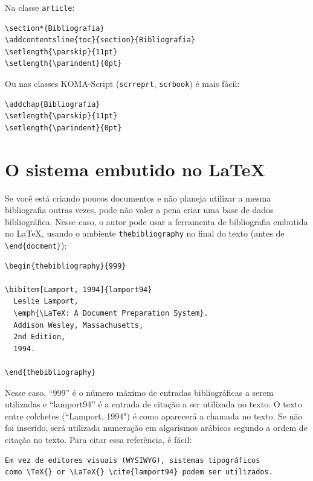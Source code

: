 Na classe \texttt{article}:

\begin{verbatim}
\section*{Bibliografia}
\addcontentsline{toc}{section}{Bibliografia}
\setlength{\parskip}{11pt}
\setlength{\parindent}{0pt}
\end{verbatim}

Ou nas classes KOMA-Script (\texttt{scrreprt}, \texttt{scrbook}) é mais fácil:

\begin{verbatim}
\addchap{Bibliografia}
\setlength{\parskip}{11pt}
\setlength{\parindent}{0pt}
\end{verbatim}

\section{O sistema embutido no LaTeX}
\label{bibliografia-latex-embutido}
Se você está criando poucos documentos e não planeja utilizar a mesma bibliografia outras vezes, pode não valer a pena criar uma base de dados bibliográfica. Nesse caso, o autor pode usar a ferramenta de bibliografia embutida no LaTeX, usando o ambiente \texttt{thebibliography} no final do texto (antes de \verb+\end{docment}+):

\begin{verbatim}
\begin{thebibliography}{999}

\bibitem[Lamport, 1994]{lamport94}
  Leslie Lamport,
  \emph{\LaTeX: A Document Preparation System}.
  Addison Wesley, Massachusetts,
  2nd Edition,
  1994.

\end{thebibliography}
\end{verbatim}

Nesse caso, “999” é o número máximo de entradas bibliográficas a serem utilizadas e “lamport94” é a entrada de citação a ser utilizada no texto. O texto entre colchetes (``Lamport, 1994") é como aparecerá a chamada no texto. Se não foi inserido, será utilizada numeração em algarismos arábicos segundo a ordem de citação no texto. Para citar essa referência, é fácil: 


\begin{verbatim}
Em vez de editores visuais (WYSIWYG), sistemas tipográficos 
como \TeX{} or \LaTeX{} \cite{lamport94} podem ser utilizados.
\end{verbatim}

